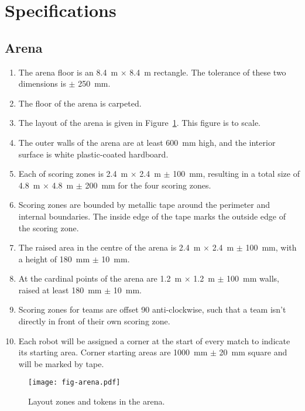 \section{Specifications}
\label{sec:specs}

\subsection{Arena}
\label{spec:arena}

\begin{enumerate}
  \item The arena floor is an \SI{8.4}{m} $\times$ \SI{8.4}{m} rectangle. The
        tolerance of these two dimensions is $\pm$ \SI{250}{mm}.
  \item The floor of the arena is carpeted.
  \item The layout of the arena is given in Figure~\ref{fig:arena}. This
        figure is to scale.
  \item The outer walls of the arena are at least \SI{600}{mm} high, and the
        interior surface is white plastic-coated hardboard.
  \item Each of scoring zones is \SI{2.4}{m} $\times$ \SI{2.4}{m} $\pm$ \SI{100}{mm},
        resulting in a total size of \SI{4.8}{m} $\times$ \SI{4.8}{m} $\pm$ \SI{200}{mm}
        for the four scoring zones.
  \item Scoring zones are bounded by metallic tape around the perimeter
        and internal boundaries. The inside edge of the tape marks the outside
        edge of the scoring zone.
  \item The raised area in the centre of the arena is \SI{2.4}{m} $\times$ \SI{2.4}{m} $\pm$ \SI{100}{mm},
        with a height of \SI{180}{mm} $\pm$ \SI{10}{mm}.
  \item At the cardinal points of the arena are \SI{1.2}{m} $\times$ \SI{1.2}{m} $\pm$ \SI{100}{mm} walls,
        raised at least \SI{180}{mm} $\pm$ \SI{10}{mm}.
  \item Scoring zones for teams are offset 90\degree{} anti-clockwise, such
        that a team isn't directly in front of their own scoring zone.
  \item Each robot will be assigned a corner at the start of every match to indicate its starting area.
        Corner starting areas are \SI{1000}{mm} $\pm$ \SI{20}{mm} square and will be marked by tape.
\end{enumerate}

\begin{figure}
  \texttt{[image: fig-arena.pdf]}
  \caption{Layout zones and tokens in the arena.}
  \label{fig:arena}
\end{figure}

